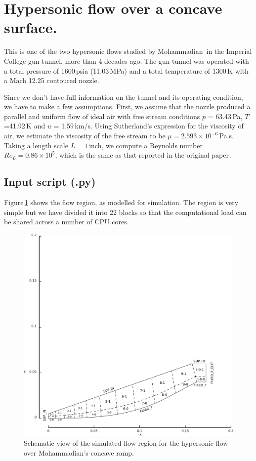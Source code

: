 
\section{Hypersonic flow over a concave surface.}
\label{sec:cubic-ramp}
%
This is one of the two hypersonic flows studied by Mohammadian\,\cite{mohammadian_1972a}
in the Imperial College gun tunnel, more than 4 decades ago.
The gun tunnel was operated with a total pressure of 1600\,psia (11.03\,MPa) and 
a total temperature of 1300\,K with a Mach 12.25 contoured nozzle.

\medskip
Since we don't have full information on the tunnel and its operating condition, 
we have to make a few assumptions.
First, we assume that the nozzle produced a parallel and uniform flow of ideal air 
with free stream conditions $p$ = 63.43\,Pa, $T$=41.92\,K and $u$ = 1.59\,km/s.
Using Sutherland's expression for the viscosity of air, 
we estimate the viscosity of the free stream to be $\mu = 2.593 \times 10^{-6}$\,Pa.s.
Taking a length scale $L = 1$\,inch, we compute a Reynolds number $Re_L = 0.86 \times 10^{5}$,
which is the same as that reported in the original paper\,\cite{mohammadian_1972a}.

\bigskip
\subsection{Input script (.py)}
%
Figure\,\ref{fig:cubic-ramp-geometry} shows the flow region, as modelled for simulation.
The region is very simple but we have divided it into 22 blocks so that the computational load 
can be shared across a number of CPU cores.

\begin{figure}[htbp]
 \centering
 \includegraphics[width=\textwidth,viewport=0 0 520 214,clip=true]{../2D/cubic-ramp/cubic-ramp-edited.pdf}
 \caption{Schematic view of the simulated flow region for the hypersonic flow
          over Mohammadian's concave ramp.}
 \label{fig:cubic-ramp-geometry}
\end{figure}

